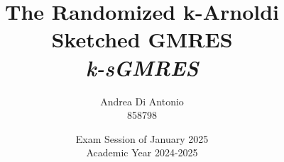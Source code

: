 
\newcommand{\documenttitle}{The Randomized k-Arnoldi Sketched GMRES}
\newcommand{\documentsubtitle}{k-sGMRES}

\newcommand{\documentauthor}{Andrea Di Antonio}
\newcommand{\documentdate}{Exam Session of January 2025 \\ Academic Year 2024-2025}

\title{\textbf{\documenttitle} \\ \textit{\documentsubtitle}}
\author{\documentauthor \\ 858798}
\date{\documentdate}

\newcommand{\accentcolor}{solarized-blue} %
\newcommand{\urlcolor}{solarized-red} %